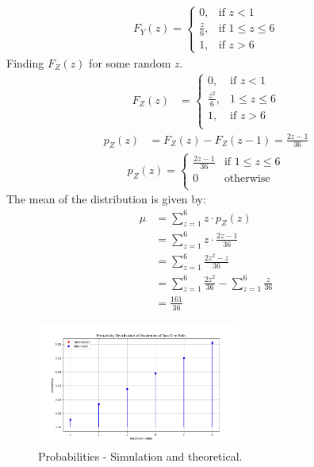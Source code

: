 \documentclass[journal,12pt,twocolumn]{IEEEtran}
\begin{document}
\begin{align}
F_Y(z) = \begin{cases}
  0, & \text{if } z < 1 \\
  \frac{z}{6}, & \text{if } 1 \leq z \leq 6 \\
  1, & \text{if } z > 6
\end{cases}
\end{align}
Finding $F_Z(z)$ for some random $z$.
\begin{align}
F_Z(z) &=
    \begin{cases}
     0, & \text{if } z < 1 \\
    \frac{z^2}{6}, & 1 \leq z \leq 6\\
     1, & \text{if } z > 6 \\
    \end{cases}
\end{align}
\begin{align}
p_Z(z) &= F_Z(z) - F_Z(z-1) = \frac{2z-1}{36} 
\end{align}
\begin{align}
p_Z(z) = \begin{cases} 
       \frac{2z-1}{36} & \text{if } 1 \leq z \leq 6 \\
        0 & \text{otherwise} \\
         \end{cases}
\end{align}
The mean of the distribution is given by:
\begin{align}
\mu &= \sum_{z=1}^{6} z \cdot p_Z(z) \\
&= \sum_{z=1}^{6} z \cdot \frac{2z-1}{36} \\
&= \sum_{z=1}^{6} \frac{2z^2-z}{36} \\
&= \sum_{z=1}^{6} \frac{2z^2}{36} - \sum_{z=1}^{6} \frac{z}{36} \\ 
&= \frac{161}{36}
\end{align}
\begin{figure}[ht]
\centering
\includegraphics[width=0.6\textwidth]{figs/Figure.png}
\caption{Probabilities - Simulation and theoretical.}
\label{fig:exemplar.12.13.3.35}
\end{figure}
\end{document}
